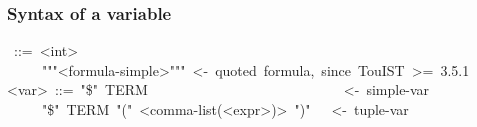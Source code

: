 \subsubsection{Syntax of a variable}\label{sec-syntax-of-a-variable}%
\begin{mdpre}%
~::=~{\textless{}int\textgreater{}}\\
~~~~\textbar{}~"""{\textless{}formula-simple\textgreater{}}"""~{\textless{}-~quoted~formula,~since~TouIST~\textgreater{}=~3.5.1}\\
{\textless{}var\textgreater{}}~::=~"\$"~TERM~~~~~~~~~~~~~~~~~~~~~~~~~~~~{\textless{}-~simple-var}\\
~~~~\textbar{}~"\$"~TERM~"("~{\textless{}comma-list(\textless{}expr\textgreater{})\textgreater{}}~")"~~~{\textless{}-~tuple-var}%
\end{mdpre}

